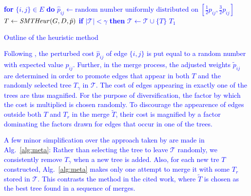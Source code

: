 \begin{algorithm}
\textcolor{blue}{
 {
  \textbf{for} $\{i,j\}\in E$ \textbf{do} $\hat{p}_{ij}\leftarrow\text{random number uniformly distributed on
  $\left[\frac{1}{2}p_{ij},\frac{3}{2}p_{ij}\right]$}$\;
  $T\leftarrow\text{\textit{SMTHeur}$(G,D,\hat{p})$}$\;
  \textbf{if} $|\mathcal{T}|<\gamma$ \textbf{then} $\mathcal{T}\leftarrow \mathcal{T}\cup \{T\}$\;
}
\Return $T_1$
}

\textcolor{blue}{
\caption{Outline of the heuristic method}
\label{alg:meta}
}
\end{algorithm}

\textcolor{blue}{
Following \citet{pajor18}, the perturbed cost $\hat{p}_{ij}$ of edge $\{i,j\}$ is put equal to a random number with expected value $p_{ij}$.
Further, in the merge process, the adjusted weights $\tilde{p}_{ij}$ are determined in order to 
promote edges that appear in both $T$ and the randomly selected tree $T_{\gamma}$ in $\mathcal{T}$. 
The cost of edges appearing in exactly one of the trees are thus magnified.
For the purpose of diversification, the factor by which the cost is multiplied is chosen randomly.
To discourage the appearence of edges outside both $T$ and $T_r$ in the merge $\tilde{T}$,
their cost is magnified by a factor dominating the factors drawn for edges that occur in one of the trees.
}

\textcolor{blue}{
A few minor simplification over the approach taken by \citet{pajor18} are made in Alg.\ \ref{alg:meta}:
Rather than selecting the tree to leave $\mathcal{T}$ randomly, we consistently remove $T_{\gamma}$ when a new tree is added.
Also, for each new tre $T$ constructed, Alg.\ \ref{alg:meta} makes only one attempt to merge it with some $T_r$ stored in $\mathcal{T}$.
This contrasts the method in the cited work, where $\tilde{T}$ is chosen as the best tree found in a sequence of merges.
}
